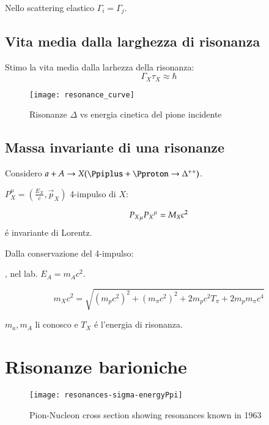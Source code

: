 \documentclass[main.tex]{subfiles}
\begin{document}
Nello scattering elastico $\Gamma_i=\Gamma_j$.

\subsection{Vita media dalla larghezza di risonanza}
Stimo la vita media dalla larhezza della risonanza:
\begin{equation*}
\Gamma_X\tau_X\approx\hbar
\end{equation*}

\begin{figure}[!ht]
\centering
\texttt{[image: resonance\_curve]}
\caption{Risonanze $\Delta$ vs energia cinetica del pione incidente}
\label{fig:resonance_curve}
\end{figure}

\clearpage

\subsection{Massa invariante di una risonanze}
Considero $a+A\rightarrow X (\Ppiplus+\Pproton\rightarrow \Delta^{++})$.

$P_X^{\mu}=(\frac{E_{X}}{c},\vec{p}_{X})$ 4-impulso di $X$:

\begin{equation*}
{P_X}_{\mu}{P_X}^{\mu}=M_Xc^2
\end{equation*}
\'e invariante di Lorentz.

Dalla conservazione del 4-impulso:

, nel lab. $E_A=m_Ac^2$.

\begin{equation*}
m_Xc^2=\sqrt{(m_pc^2)^2+(m_{\pi}c^2)^2+2m_pc^2T_{\pi}+2m_pm_{\pi}c^4}
\end{equation*}

$m_a, m_A$ li conosco e $T_X$ \'e l'energia di risonanza.


\section{Risonanze barioniche}

\begin{figure}[!ht]
\centering
\texttt{[image: resonances-sigma-energyPpi]}
\caption{Pion-Nucleon cross section showing resonances known in 1963}
\end{figure}
\end{document}
